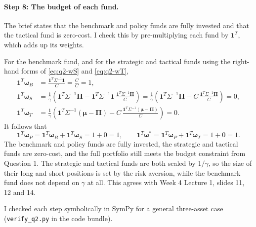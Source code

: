 \documentclass[11pt]{article}
\numberwithin{equation}{section}
\begin{document}
\paragraph{Step 8: The budget of each fund.}
The brief states that the benchmark and policy funds are fully invested and that the tactical fund is zero-cost. I check this by pre-multiplying each fund by $\mathbf{1}^{T}$, which adds up its weights.

For the benchmark fund, and for the strategic and tactical funds using the right-hand forms of \eqref{eq:q2-wS} and \eqref{eq:q2-wT},
\begin{align*}
  \mathbf{1}^{T}\bm{\omega}_{B} &= \frac{\mathbf{1}^{T}\Sigma^{-1}\mathbf{1}}{C} = \frac{C}{C} = 1, \\
  \mathbf{1}^{T}\bm{\omega}_{S}
  &= \frac{1}{\gamma}\left(\mathbf{1}^{T}\Sigma^{-1}\bm{\Pi} - \mathbf{1}^{T}\Sigma^{-1}\mathbf{1}\,\frac{\mathbf{1}^{T}\Sigma^{-1}\bm{\Pi}}{C}\right)
  = \frac{1}{\gamma}\left(\mathbf{1}^{T}\Sigma^{-1}\bm{\Pi} - C\,\frac{\mathbf{1}^{T}\Sigma^{-1}\bm{\Pi}}{C}\right) = 0, \\
  \mathbf{1}^{T}\bm{\omega}_{T}
  &= \frac{1}{\gamma}\left(\mathbf{1}^{T}\Sigma^{-1}(\bm{\mu} - \bm{\Pi}) - C\,\frac{\mathbf{1}^{T}\Sigma^{-1}(\bm{\mu} - \bm{\Pi})}{C}\right) = 0.
\end{align*}
It follows that
\begin{equation*}
  \mathbf{1}^{T}\bm{\omega}_{P} = \mathbf{1}^{T}\bm{\omega}_{B} + \mathbf{1}^{T}\bm{\omega}_{S} = 1 + 0 = 1,
  \qquad
  \mathbf{1}^{T}\bm{\omega}^{*} = \mathbf{1}^{T}\bm{\omega}_{P} + \mathbf{1}^{T}\bm{\omega}_{T} = 1 + 0 = 1.
\end{equation*}
The benchmark and policy funds are fully invested, the strategic and tactical funds are zero-cost, and the full portfolio still meets the budget constraint from Question 1. The strategic and tactical funds are both scaled by $1/\gamma$, so the size of their long and short positions is set by the risk aversion, while the benchmark fund does not depend on $\gamma$ at all. This agrees with Week 4 Lecture 1, slides 11, 12 and 14.

I checked each step symbolically in SymPy for a general three-asset case (\texttt{verify\_q2.py} in the code bundle).
\end{document}
